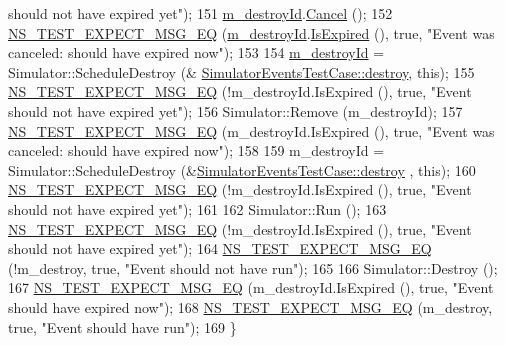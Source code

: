 \begin{DoxyCode}
{       should not have expired yet"});
151   \hyperlink{classSimulatorEventsTestCase_ad41df455eecac73af5e5b6b697c837b8}{m\_destroyId}.\hyperlink{classns3_1_1EventId_a993ae94e48e014e1afd47edb16db7a11}{Cancel} ();
152   \hyperlink{group__testing_ga7304ba46a28d8cf08dfdfd6499cf7068}{NS\_TEST\_EXPECT\_MSG\_EQ} (\hyperlink{classSimulatorEventsTestCase_ad41df455eecac73af5e5b6b697c837b8}{m\_destroyId}.\hyperlink{classns3_1_1EventId_a5c30c92e7c1c34b4e8505cc07ed71b02}{IsExpired} (), \textcolor{keyword}{true}, \textcolor{stringliteral}{"Event
       was canceled: should have expired now"});
153 
154   \hyperlink{classSimulatorEventsTestCase_ad41df455eecac73af5e5b6b697c837b8}{m\_destroyId} = Simulator::ScheduleDestroy (&
      \hyperlink{classSimulatorEventsTestCase_a1ccb189e5b14b7d42e5641e575fee4a2}{SimulatorEventsTestCase::destroy}, \textcolor{keyword}{this});
155   \hyperlink{group__testing_ga7304ba46a28d8cf08dfdfd6499cf7068}{NS\_TEST\_EXPECT\_MSG\_EQ} (!m\_destroyId.IsExpired (), \textcolor{keyword}{true}, \textcolor{stringliteral}{"Event should not have
       expired yet"});
156   Simulator::Remove (m\_destroyId);
157   \hyperlink{group__testing_ga7304ba46a28d8cf08dfdfd6499cf7068}{NS\_TEST\_EXPECT\_MSG\_EQ} (m\_destroyId.IsExpired (), \textcolor{keyword}{true}, \textcolor{stringliteral}{"Event was canceled: should
       have expired now"});
158 
159   m\_destroyId = Simulator::ScheduleDestroy (&\hyperlink{classSimulatorEventsTestCase_a1ccb189e5b14b7d42e5641e575fee4a2}{SimulatorEventsTestCase::destroy}
      , \textcolor{keyword}{this});
160   \hyperlink{group__testing_ga7304ba46a28d8cf08dfdfd6499cf7068}{NS\_TEST\_EXPECT\_MSG\_EQ} (!m\_destroyId.IsExpired (), \textcolor{keyword}{true}, \textcolor{stringliteral}{"Event should not have
       expired yet"});
161 
162   Simulator::Run ();
163   \hyperlink{group__testing_ga7304ba46a28d8cf08dfdfd6499cf7068}{NS\_TEST\_EXPECT\_MSG\_EQ} (!m\_destroyId.IsExpired (), \textcolor{keyword}{true}, \textcolor{stringliteral}{"Event should not have
       expired yet"});
164   \hyperlink{group__testing_ga7304ba46a28d8cf08dfdfd6499cf7068}{NS\_TEST\_EXPECT\_MSG\_EQ} (!m\_destroy, \textcolor{keyword}{true}, \textcolor{stringliteral}{"Event should not have run"});
165 
166   Simulator::Destroy ();
167   \hyperlink{group__testing_ga7304ba46a28d8cf08dfdfd6499cf7068}{NS\_TEST\_EXPECT\_MSG\_EQ} (m\_destroyId.IsExpired (), \textcolor{keyword}{true}, \textcolor{stringliteral}{"Event should have expired
       now"});
168   \hyperlink{group__testing_ga7304ba46a28d8cf08dfdfd6499cf7068}{NS\_TEST\_EXPECT\_MSG\_EQ} (m\_destroy, \textcolor{keyword}{true}, \textcolor{stringliteral}{"Event should have run"});
169 \}
\end{DoxyCode}


